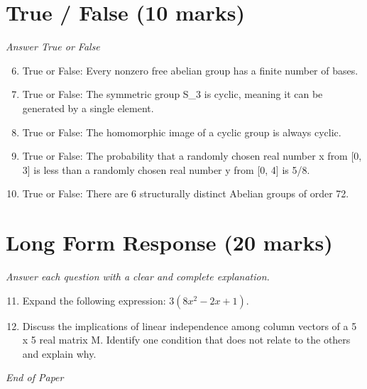 \documentclass[12pt]{article}
\begin{document}
\section*{True / False (10 marks)}
\textit{Answer True or False}
\begin{enumerate}[label=\arabic*.]
\setcounter{enumi}{5}
\item True or False: Every nonzero free abelian group has a finite number of bases.
\item True or False: The symmetric group S\_3 is cyclic, meaning it can be generated by a single element.
\item True or False: The homomorphic image of a cyclic group is always cyclic.
\item True or False: The probability that a randomly chosen real number x from [0, 3] is less than a randomly chosen real number y from [0, 4] is 5/8.
\item True or False: There are 6 structurally distinct Abelian groups of order 72.
\end{enumerate}

\section*{Long Form Response (20 marks)}
\textit{Answer each question with a clear and complete explanation.}
\begin{enumerate}[label=\arabic*.]
\setcounter{enumi}{10}
\item Expand the following expression: $3(8x^2-2x+1)$.
\item Discuss the implications of linear independence among column vectors of a 5 x 5 real
matrix M. Identify one condition that does not relate to the others and explain why.
\end{enumerate}

\vfill
\noindent\textit{End of Paper}
\end{document}
